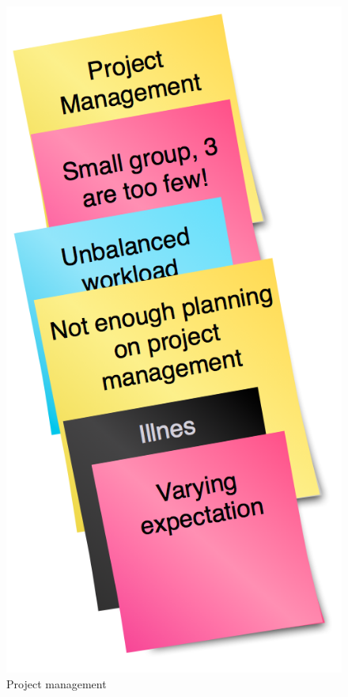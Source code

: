 \documentclass[titlepage,a4paper,11pt]{article}
\begin{document}
\begin{figure}[H]
    \begin{minipage}[b]{0.5\linewidth}
        \centering
        \includegraphics[scale=0.4]{graphics/postit/NEG_project_management}
        \caption{Project management}
        \label{fig:neg3}
    \end{minipage}

\end{figure}
\end{document}
